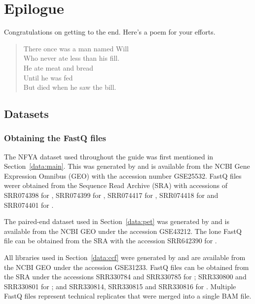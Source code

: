 \documentclass{report}\usepackage[]{graphicx}\usepackage[usenames,dvipsnames]{color}
\newenvironment{combox}
{ \definecolor{shadecolor}{RGB}{255, 240, 240} \begin{shaded}\begin{center}\begin{minipage}[t]{0.95\textwidth} }
{ \end{minipage}\end{center}\end{shaded} \definecolor{shadecolor}{RGB}{240,240,240} }
\begin{document}

\chapter{Epilogue}

\begin{combox}
Congratulations on getting to the end. Here's a poem for your efforts.
\begin{quote}
There once was a man named Will \\
Who never ate less than his fill. \\
He ate meat and bread \\
Until he was fed \\
But died when he saw the bill. 
\end{quote}
\end{combox}

\section{Datasets}
\label{sec:dataset}

\subsection{Obtaining the FastQ files}
The NFYA dataset used throughout the guide was first mentioned in Section~\ref{data:main}. 
This was generated by \cite{tiwari2012} and is available from the NCBI Gene Expression Omnibus (GEO) with the accession number GSE25532. 
FastQ files werer obtained from the Sequence Read Archive (SRA) with accessions of SRR074398 for , SRR074399 for , SRR074417 for , SRR074418 for  and SRR074401 for .

The paired-end dataset used in Section~\ref{data:pet} was generated by \cite{pal2013} and is available from the NCBI GEO under the accession GSE43212.
The lone FastQ file can be obtained from the SRA with the accession SRR642390 for .

All libraries used in Section~\ref{data:ccf} were generated by \cite{zhang2012} and are available from the NCBI GEO under the accession GSE31233. 
FastQ files can be obtained from the SRA under the accessions SRR330784 and SRR330785 for ; SRR330800 and SRR330801 for ; and SRR330814, SRR330815 and SRR330816 for . 
Multiple FastQ files represent technical replicates that were merged into a single BAM file.
\end{document}
